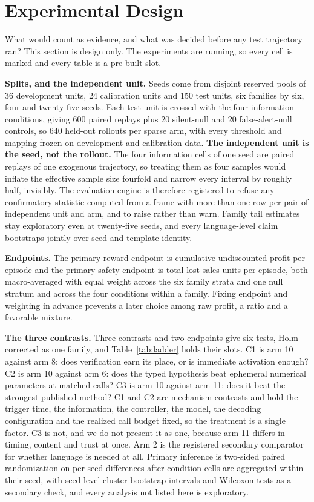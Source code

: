 \section{Experimental Design}
\label{sec:experiments}

What would count as evidence, and what was decided before any test trajectory
ran? This section is design only. The experiments are running, so every cell is
marked \pending{} and every table is a pre-built slot.

\textbf{Splits, and the independent unit.} Seeds come from disjoint reserved
pools of 36 development units, 24 calibration units and 150 test units, six
families by six, four and twenty-five seeds. Each test unit is crossed with the
four information conditions, giving 600 paired replays plus 20 silent-null and 20
false-alert-null controls, so 640 held-out rollouts per sparse arm, with every
threshold and mapping frozen on development and calibration data. \textbf{The independent unit is the seed, not the rollout.} The four
information cells of one seed are paired replays of one exogenous trajectory, so
treating them as four samples would inflate the effective sample size fourfold
and narrow every interval by roughly half, invisibly. The evaluation engine is
therefore registered to refuse any confirmatory statistic computed from a frame
with more than one row per pair of independent unit and arm, and to raise rather
than warn. Family tail estimates stay exploratory even at twenty-five seeds, and
every language-level claim bootstraps jointly over seed and template identity.

\textbf{Endpoints.} The primary reward endpoint is cumulative undiscounted profit
per episode and the primary safety endpoint is total lost-sales units per episode,
both macro-averaged with equal weight across the six family strata and one null
stratum and across the four conditions within a family. Fixing endpoint and
weighting in advance prevents a later choice among raw profit, a ratio and a
favorable mixture.

\textbf{The three contrasts.} Three contrasts and two endpoints give six tests,
Holm-corrected as one family, and Table~\ref{tab:ladder} holds their slots. C1 is arm 10 against arm 8: does verification earn
its place, or is immediate activation enough? C2 is arm 10 against arm 6: does
the typed hypothesis beat ephemeral numerical parameters at matched calls? C3 is
arm 10 against arm 11: does it beat the strongest published method? C1 and C2 are
mechanism contrasts and hold the trigger time, the information, the controller,
the model, the decoding configuration and the realized call budget fixed, so the
treatment is a single factor. C3 is not, and we do not present it as one, because
arm 11 differs in timing, content and trust at once. Arm 2 is the registered
secondary comparator for whether language is needed at all. Primary inference is
two-sided paired randomization on per-seed differences after condition cells are
aggregated within their seed, with seed-level cluster-bootstrap intervals and
Wilcoxon tests as a secondary check, and every analysis not listed here is
exploratory.

